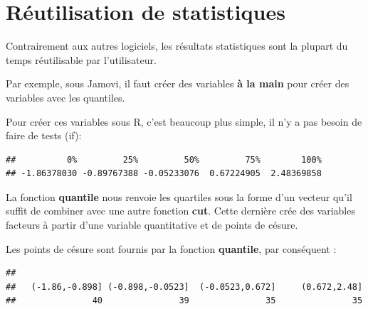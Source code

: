 \documentclass[
]{book}
\newenvironment{Shaded}{\begin{snugshade}}{\end{snugshade}}
\newcommand{\AttributeTok}[1]{\textcolor[rgb]{0.13,0.29,0.53}{#1}}
\newcommand{\FunctionTok}[1]{\textcolor[rgb]{0.13,0.29,0.53}{\textbf{#1}}}
\newcommand{\NormalTok}[1]{#1}
\newcommand{\SpecialCharTok}[1]{\textcolor[rgb]{0.81,0.36,0.00}{\textbf{#1}}}
\begin{document}
\hypertarget{ruxe9utilisation-de-statistiques}{%
\section{Réutilisation de statistiques}\label{ruxe9utilisation-de-statistiques}}

Contrairement aux autres logiciels, les résultats statistiques sont la plupart
du temps réutilisable par l'utilisateur.

Par exemple, sous Jamovi, il faut créer des variables \textbf{à la main} pour créer
des variables avec les quantiles.

Pour créer ces variables sous R, c'est beaucoup plus simple, il n'y a pas besoin
de faire de tests (if):

\begin{Shaded}
\end{Shaded}

\begin{verbatim}
##          0%         25%         50%         75%        100% 
## -1.86378030 -0.89767388 -0.05233076  0.67224905  2.48369858
\end{verbatim}

La fonction \textbf{quantile} nous renvoie les quartiles sous la forme d'un vecteur qu'il
suffit de combiner avec une autre fonction \textbf{cut}. Cette dernière crée des
variables facteurs à partir d'une variable quantitative et de points de césure.

Les points de césure sont fournis par la fonction \textbf{quantile}, par conséquent :

\begin{Shaded}
\end{Shaded}

\begin{verbatim}
## 
##   (-1.86,-0.898] (-0.898,-0.0523]  (-0.0523,0.672]     (0.672,2.48] 
##               40               39               35               35
\end{verbatim}
\end{document}
